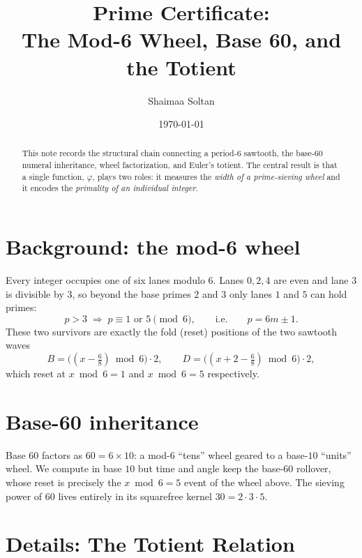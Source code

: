 \documentclass[11pt]{article}
\title{Prime Certificate:\\ The Mod-6 Wheel, Base 60, and the Totient}
\author{Shaimaa Soltan}
\date{\today}
\theoremstyle{definition}
\begin{document}
\maketitle

\begin{abstract}
This note records the structural chain connecting a period-6 sawtooth,
the base-60 numeral inheritance, wheel factorization, and Euler's totient.
The central result is that a single function, $\varphi$, plays two roles:
it measures the \emph{width of a prime-sieving wheel} and it encodes the
\emph{primality of an individual integer}.
\end{abstract}

\section{Background: the mod-6 wheel}

Every integer occupies one of six lanes modulo $6$. Lanes
$0,2,4$ are even and lane $3$ is divisible by $3$, so beyond the base
primes $2$ and $3$ only lanes $1$ and $5$ can hold primes:
\[
p > 3 \;\Longrightarrow\; p \equiv 1 \text{ or } 5 \pmod 6,
\qquad\text{i.e.}\qquad p = 6m \pm 1 .
\]
These two survivors are exactly the fold (reset) positions of the two
sawtooth waves
\[
B = \bigl((x - \tfrac{6}{8}) \bmod 6\bigr)\cdot 2,
\qquad
D = \bigl((x + 2 - \tfrac{6}{8}) \bmod 6\bigr)\cdot 2 ,
\]
which reset at $x \bmod 6 = 1$ and $x \bmod 6 = 5$ respectively.

\section{Base-60 inheritance}

Base $60$ factors as $60 = 6 \times 10$: a mod-$6$ ``tens'' wheel geared to
a base-$10$ ``units'' wheel. We compute in base $10$ but time and angle
keep the base-$60$ rollover, whose reset is precisely the $x \bmod 6 = 5$
event of the wheel above. The sieving power of $60$ lives entirely in its
squarefree kernel $30 = 2\cdot 3\cdot 5$.

\section*{\textbf{Details: The Totient Relation}}
\end{document}
